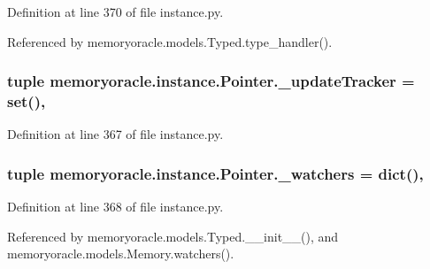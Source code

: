 Definition at line 370 of file instance.\+py.



Referenced by memoryoracle.\+models.\+Typed.\+type\+\_\+handler().

\hypertarget{classmemoryoracle_1_1instance_1_1Pointer_acff47dcd377cdf74928c5d1858d43fa5}{}
\subsubsection[{\+\_\+update\+Tracker}]{\setlength{\rightskip}{0pt plus 5cm}tuple memoryoracle.\+instance.\+Pointer.\+\_\+update\+Tracker = set()\hspace{0.3cm}{\ttfamily [static]}, {\ttfamily [private]}}\label{classmemoryoracle_1_1instance_1_1Pointer_acff47dcd377cdf74928c5d1858d43fa5}


Definition at line 367 of file instance.\+py.

\hypertarget{classmemoryoracle_1_1instance_1_1Pointer_a77e0a4c5d2637dcf1e43861c5805acda}{}
\subsubsection[{\+\_\+watchers}]{\setlength{\rightskip}{0pt plus 5cm}tuple memoryoracle.\+instance.\+Pointer.\+\_\+watchers = dict()\hspace{0.3cm}{\ttfamily [static]}, {\ttfamily [private]}}\label{classmemoryoracle_1_1instance_1_1Pointer_a77e0a4c5d2637dcf1e43861c5805acda}


Definition at line 368 of file instance.\+py.



Referenced by memoryoracle.\+models.\+Typed.\+\_\+\+\_\+init\+\_\+\+\_\+(), and memoryoracle.\+models.\+Memory.\+watchers().

\hypertarget{classmemoryoracle_1_1instance_1_1Pointer_ab386b41b9f0cf6ff19065f0ae00647b6}{}
